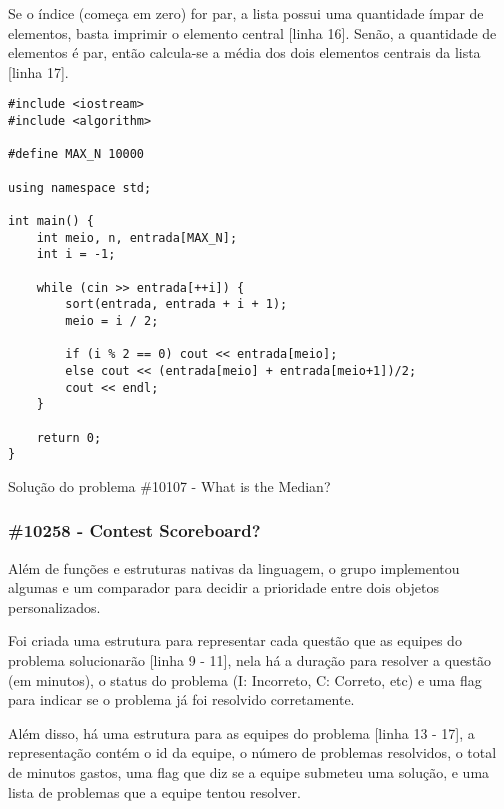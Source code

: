 \documentclass[a4paper,12pt]{scrartcl}
\begin{document}
Se o índice (começa em zero) for par, a lista possui uma quantidade ímpar de elementos, basta imprimir o elemento central [linha 16]. Senão, a quantidade de elementos é par, então calcula-se a média dos dois elementos centrais da lista [linha 17].

\begin{listing}[H]
\begin{verbatim}
#include <iostream>
#include <algorithm>

#define MAX_N 10000

using namespace std;

int main() {
    int meio, n, entrada[MAX_N];
    int i = -1;

    while (cin >> entrada[++i]) {
        sort(entrada, entrada + i + 1);
        meio = i / 2;

        if (i % 2 == 0) cout << entrada[meio];
        else cout << (entrada[meio] + entrada[meio+1])/2;
        cout << endl;
    }

    return 0;
}
\end{verbatim}
\caption{\footnotesize{Solução do problema \#10107 - What is the Median?}}
\end{listing}

\newpage
\subsubsection{\#10258 - Contest Scoreboard?}
Além de funções e estruturas nativas da linguagem, o grupo implementou algumas e um comparador para decidir a prioridade entre dois objetos personalizados.

Foi criada uma estrutura para representar cada questão que as equipes do problema solucionarão [linha 9 - 11], nela há a duração para resolver a questão (em minutos), o status do problema (I: Incorreto, C: Correto, etc) e uma flag para indicar se o problema já foi resolvido corretamente.

Além disso, há uma estrutura para as equipes do problema [linha 13 - 17], a representação contém o id da equipe, o número de problemas resolvidos, o total de minutos gastos, uma flag que diz se a equipe submeteu uma solução, e uma lista de problemas que a equipe tentou resolver.
\end{document}

